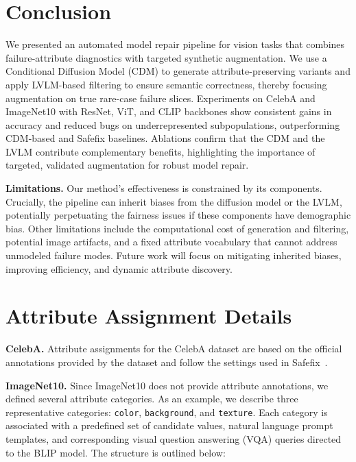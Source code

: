 \documentclass[10pt]{article} %
\newcommand{\hibug}{Safefix\xspace}
\begin{document}
\section{Conclusion}

We presented an automated model repair pipeline for vision tasks that combines failure‐attribute diagnostics with targeted synthetic augmentation. We use a Conditional Diffusion Model (CDM) to generate attribute-preserving variants and apply LVLM-based filtering to ensure semantic correctness, thereby focusing augmentation on true rare-case failure slices. Experiments on CelebA and ImageNet10 with ResNet, ViT, and CLIP backbones show consistent gains in accuracy and reduced bugs on underrepresented subpopulations, outperforming CDM-based and \hibug{} baselines. Ablations confirm that the CDM and the LVLM contribute complementary benefits, highlighting the importance of targeted, validated augmentation for robust model repair.

\noindent\textbf{Limitations.}
Our method’s effectiveness is constrained by its components. Crucially, the pipeline can inherit biases from the diffusion model or the LVLM, potentially perpetuating the fairness issues if these components have demographic bias. Other limitations include the computational cost of generation and filtering, potential image artifacts, and a fixed attribute vocabulary that cannot address unmodeled failure modes. Future work will focus on mitigating inherited biases, improving efficiency, and dynamic attribute discovery.








\clearpage
\appendix







\section{Attribute Assignment Details}
\label{sec:attribute_assignment}

\noindent \textbf{CelebA.} Attribute assignments for the CelebA dataset are based on the official annotations provided by the dataset and follow the settings used in \hibug~\citep{chen2023hibug}.

\noindent \textbf{ImageNet10.} Since ImageNet10 does not provide attribute annotations, we defined several attribute categories. As an example, we describe three representative categories: \texttt{color}, \texttt{background}, and \texttt{texture}. Each category is associated with a predefined set of candidate values, natural language prompt templates, and corresponding visual question answering (VQA) queries directed to the BLIP model. The structure is outlined below:
\end{document}
